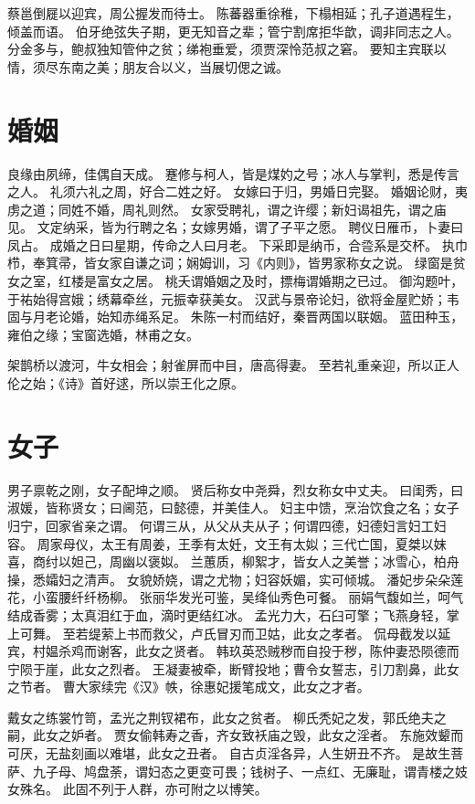 \documentclass[12pt,UTF8]{ctexbook}
\begin{document}
蔡邕倒屣以迎宾，周公握发而待士。
陈蕃器重徐稚，下榻相延；孔子道遇程生，倾盖而语。
伯牙绝弦失子期，更无知音之辈；管宁割席拒华歆，调非同志之人。
分金多与，鲍叔独知管仲之贫；绨袍垂爱，须贾深怜范叔之窘。
要知主宾联以情，须尽东南之美；朋友合以义，当展切偲之诚。

\chapter{婚姻}

良缘由夙缔，佳偶自天成。
蹇修与柯人，皆是煤妁之号；冰人与掌判，悉是传言之人。
礼须六礼之周，好合二姓之好。
女嫁曰于归，男婚日完娶。
婚姻论财，夷虏之道；同姓不婚，周礼则然。
女家受聘礼，谓之许缨；新妇谒祖先，谓之庙见。
文定纳采，皆为行聘之名；女嫁男婚，谓了子平之愿。
聘仪日雁币，卜妻曰凤占。
成婚之日曰星期，传命之人曰月老。
下采即是纳币，合卺系是交杯。
执巾栉，奉箕帚，皆女家自谦之词；娴姆训，习《内则》，皆男家称女之说。
绿窗是贫女之室，红楼是富女之居。
桃夭谓婚姻之及时，摽梅谓婚期之已过。
御沟题叶，于祐始得宫娥；绣幕牵丝，元振幸获美女。
汉武与景帝论妇，欲将金屋贮娇；韦固与月老论婚，始知赤绳系足。
朱陈一村而结好，秦晋两国以联姻。
蓝田种玉，雍伯之缘；宝窗选婚，林甫之女。

架鹊桥以渡河，牛女相会；射雀屏而中目，唐高得妻。
至若礼重亲迎，所以正人伦之始；《诗》首好逑，所以崇王化之原。

\chapter{女子}

男子禀乾之刚，女子配坤之顺。
贤后称女中尧舜，烈女称女中丈夫。
曰闺秀，曰淑媛，皆称贤女；曰阃范，曰懿德，并美佳人。
妇主中馈，烹治饮食之名；女子归宁，回家省亲之谓。
何谓三从，从父从夫从子；何谓四德，妇德妇言妇工妇容。
周家母仪，太王有周姜，王季有太妊，文王有太姒；三代亡国，夏桀以妺喜，商纣以妲己，周幽以褒姒。
兰蕙质，柳絮才，皆女人之美誉；冰雪心，柏舟操，悉孀妇之清声。
女貌娇娆，谓之尤物；妇容妖媚，实可倾城。
潘妃步朵朵莲花，小蛮腰纤纤杨柳。
张丽华发光可鉴，吴绛仙秀色可餐。
丽娟气馥如兰，呵气结成香雾；太真泪红于血，滴时更结红冰。
孟光力大，石臼可擎；飞燕身轻，掌上可舞。
至若缇萦上书而救父，卢氏冒刃而卫姑，此女之孝者。
侃母截发以延宾，村媪杀鸡而谢客，此女之贤者。
韩玖英恐贼秽而自投于秽，陈仲妻恐陨德而宁陨于崖，此女之烈者。
王凝妻被牵，断臂投地；曹令女誓志，引刀割鼻，此女之节者。
曹大家续完《汉》帙，徐惠妃援笔成文，此女之才者。

戴女之练裳竹笥，孟光之荆钗裙布，此女之贫者。
柳氏秃妃之发，郭氏绝夫之嗣，此女之妒者。
贾女偷韩寿之香，齐女致袄庙之毁，此女之淫者。
东施效颦而可厌，无盐刻画以难堪，此女之丑者。
自古贞淫各异，人生妍丑不齐。
是故生菩萨、九子母、鸠盘荼，谓妇态之更变可畏；钱树子、一点红、无廉耻，谓青楼之妓女殊名。
此固不列于人群，亦可附之以博笑。
\end{document}
